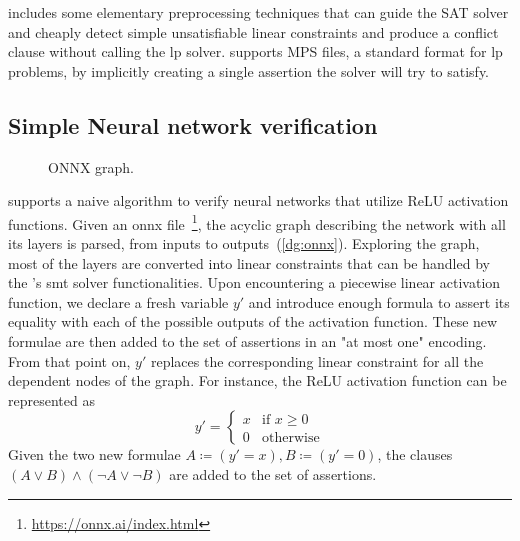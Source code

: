 \documentclass[runningheads]{llncs}
\begin{document}
\dlinear includes some elementary preprocessing techniques that can guide the SAT solver and cheaply detect simple unsatisfiable linear constraints and produce a conflict clause without calling the \gls{lp} solver.
\dlinear supports MPS files, a standard format for \gls{lp} problems, by implicitly creating a single assertion the solver will try to satisfy.

\subsection{Simple Neural network verification}
\label{sec:nn-verification}

\begin{figure}
    \captionsetup{font=small}
    \vspace{-2.3cm}
    \resizebox{1.04\linewidth}{!}{%
        
    }
    \caption{ONNX graph.}
    \label{dg:onnx}
\end{figure}

\dlinear supports a naive algorithm to verify neural networks that utilize ReLU activation functions.
Given an \gls{onnx} file~\footnote{\url{https://onnx.ai/index.html}}, the acyclic graph describing the network with all its layers is parsed, from inputs to outputs~(\autoref{dg:onnx}).
Exploring the graph, most of the layers are converted into linear constraints that can be handled by the \dlinear's \gls{smt} solver functionalities.
Upon encountering a piecewise linear activation function, we declare a fresh variable $y'$ and introduce enough formula to assert its equality with each of the possible outputs of the activation function.
These new formulae are then added to the set of assertions in an "at most one" encoding.
From that point on, $y'$ replaces the corresponding linear constraint for all the dependent nodes of the graph.
For instance, the ReLU activation function can be represented as
\begin{equation*}
    y' = \begin{cases}
        x & \text{if } x \ge 0 \\
        0 & \text{otherwise}
    \end{cases}
\end{equation*}
Given the two new formulae $A \coloneqq (y' = x), B \coloneqq (y' = 0)$, the clauses $(A \lor B) \land (\neg A \lor \neg B)$ are added to the set of assertions.
\end{document}
